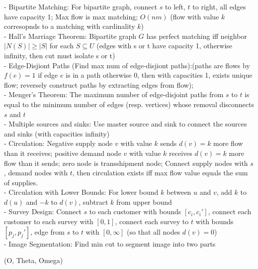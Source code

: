 \documentclass[10pt]{CheatSheet/hw}
\begin{document}
\begin{multicols*}{5}
- Bipartite Matching: For bipartite graph, connect $s$ to left, $t$ to right, all edges have capacity 1; Max flow is max matching; $O(nm)$ (flow with value $k$ corresopnds to a matching with cardinality $k$)\\
- Hall's Marriage Theorem: Bipartite graph $G$ has perfect matching iff neighbor $|N(S)|\ge|S|$ for each $S\subseteq U$ (edges with s or t have capacity 1, otherwise infinity, then cut must isolate s or t)\\
- Edge-Disjiont Paths (Find max num of edge-disjiont paths):(paths are flows by $f(e)=1$ if edge $e$ is in a path otherwise 0, then with capacities 1, exists unique flow; reversely construct paths by extracting edges from flow); \\ 
- Menger's Theorem: The maximum number of edge-disjoint paths from $s$ to $t$ is equal to the minimum number of edges (resp. vertices) whose removal disconnects $s$ and $t$\\
- Multiple sources and sinks: Use master source and sink to connect the sources and sinks (with capacities infinity)\\
- Circulation: Negative supply node $v$ with value $k$ sends $d(v)=k$ more flow than it receives; positive demand node $v$ with value $k$ receives $d(v)=k$ more flow than it sends; zero node is transshipment node; Connect supply nodes with $s$, demand nodes with $t$, then circulation exists iff max flow value equals the sum of supplies.\\
- Circulation with Lower Bounds: For lower bound $k$ between $u$ and $v$, add $k$ to $d(u)$ and $-k$ to $d(v)$, subtract $k$ from upper bound\\
- Survey Design: Connect $s$ to each customer with bounds $[c_i,c_i']$, connect each customer to each survey with $[0,1]$, connect each survey to $t$ with bounds $[p_j,p_j']$, edge from $s$ to $t$ with $[0,\infty]$ (so that all nodes $d(v)=0$)\\
- Image Segmentation: Find min cut to segment image into two parts\\

\end{multicols*}

\np 
{}
(O, Theta, Omega)

\end{document}

